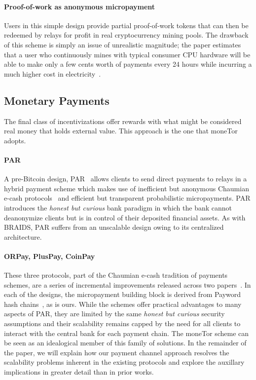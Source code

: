 \paragraph*{Proof-of-work as anonymous micropayment} Users in this simple design
provide partial proof-of-work tokens that can then be redeemed by relays for
profit in real cryptocurrency mining pools. The drawback of this scheme is
simply an issue of unrealistic magnitude; the paper estimates that a user who
continuously mines with typical consumer CPU hardware will be able to make only
a few cents worth of payments every 24 hours while incurring a much higher cost
in electricity~\cite{biryukov2015proof}.
\subsection{Monetary Payments}
\label{sub:monetary}

The final class of incentivizations offer rewards with what might be considered
real money that holds external value. This approach is the one that moneTor adopts.

\paragraph*{PAR} A pre-Bitcoin design, PAR~\cite{androulaki2008payment}
allows clients to send direct payments to relays in a hybrid payment scheme
which makes use of inefficient but anonymous Chaumian e-cash
protocols~\cite{chaum1988untraceable} and efficient but transparent
probabilistic micropayments. PAR introduces the \emph{honest but curious} bank
paradigm in which the bank cannot deanonymize clients but is in control of their
deposited financial assets. As with BRAIDS, PAR suffers from an unscalable
design owing to its centralized architecture.

\paragraph*{ORPay, PlusPay, CoinPay} These three protocols, part of the
Chaumian e-cash tradition of payments schemes, are a series of incremental
improvements released across two papers~\cite{chen2009xpay,
  carbunar2012tipping}. In each of the designs, the micropayment building block
is derived from Payword hash chains~\cite{rivest1996payword}, as is ours. While
the schemes offer practical advantages to many aspects of PAR, they are limited
by the same \emph{honest but curious} security assumptions and their scalability
remains capped by the need for all clients to interact with the central bank for
each payment chain. The moneTor scheme can be seen as an idealogical member of
this family of solutions. In the remainder of the paper, we will explain how our
payment channel approach resolves the scalability problems inherent in the
existing protocols and explore the auxillary implications in greater detail than
in prior works.

